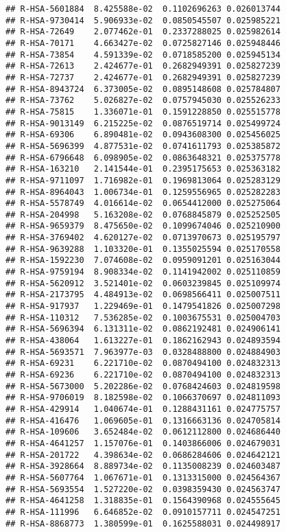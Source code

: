 \documentclass[
]{article}
\begin{document}
\begin{verbatim}
## R-HSA-5601884  8.425588e-02  0.1102696263 0.026013744
## R-HSA-9730414  5.906933e-02  0.0850545507 0.025985221
## R-HSA-72649    2.077462e-01  0.2337288025 0.025982614
## R-HSA-70171    4.663427e-02  0.0725827146 0.025948446
## R-HSA-73854    4.591339e-02  0.0718585200 0.025945134
## R-HSA-72613    2.424677e-01  0.2682949391 0.025827239
## R-HSA-72737    2.424677e-01  0.2682949391 0.025827239
## R-HSA-8943724  6.373005e-02  0.0895148608 0.025784807
## R-HSA-73762    5.026827e-02  0.0757945030 0.025526233
## R-HSA-75815    1.336071e-01  0.1591228850 0.025515778
## R-HSA-9013149  6.215225e-02  0.0876519714 0.025499724
## R-HSA-69306    6.890481e-02  0.0943608300 0.025456025
## R-HSA-5696399  4.877531e-02  0.0741611793 0.025385872
## R-HSA-6796648  6.098905e-02  0.0863648321 0.025375778
## R-HSA-163210   2.141544e-01  0.2395175653 0.025363182
## R-HSA-9711097  1.716982e-01  0.1969813064 0.025283129
## R-HSA-8964043  1.006734e-01  0.1259556965 0.025282283
## R-HSA-5578749  4.016614e-02  0.0654412000 0.025275064
## R-HSA-204998   5.163208e-02  0.0768845879 0.025252505
## R-HSA-9659379  8.475650e-02  0.1099674046 0.025210900
## R-HSA-3769402  4.620127e-02  0.0713970673 0.025195797
## R-HSA-9639288  1.103320e-01  0.1355025594 0.025170558
## R-HSA-1592230  7.074608e-02  0.0959091201 0.025163044
## R-HSA-9759194  8.908334e-02  0.1141942002 0.025110859
## R-HSA-5620912  3.521401e-02  0.0603239845 0.025109974
## R-HSA-2173795  4.484913e-02  0.0698566411 0.025007511
## R-HSA-917937   1.229469e-01  0.1479541826 0.025007298
## R-HSA-110312   7.536285e-02  0.1003675531 0.025004703
## R-HSA-5696394  6.131311e-02  0.0862192481 0.024906141
## R-HSA-438064   1.613227e-01  0.1862162943 0.024893594
## R-HSA-5693571  7.963977e-03  0.0328488800 0.024884903
## R-HSA-69231    6.221710e-02  0.0870494100 0.024832313
## R-HSA-69236    6.221710e-02  0.0870494100 0.024832313
## R-HSA-5673000  5.202286e-02  0.0768424603 0.024819598
## R-HSA-9706019  8.182598e-02  0.1066370697 0.024811093
## R-HSA-429914   1.040674e-01  0.1288431161 0.024775757
## R-HSA-416476   1.069605e-01  0.1316663136 0.024705814
## R-HSA-109606   3.652484e-02  0.0612112800 0.024686440
## R-HSA-4641257  1.157076e-01  0.1403866006 0.024679031
## R-HSA-201722   4.398634e-02  0.0686284606 0.024642121
## R-HSA-3928664  8.889734e-02  0.1135008239 0.024603487
## R-HSA-5607764  1.067671e-01  0.1313315000 0.024564367
## R-HSA-5693554  1.527220e-02  0.0398359430 0.024563747
## R-HSA-4641258  1.318835e-01  0.1564390968 0.024555645
## R-HSA-111996   6.646852e-02  0.0910157711 0.024547251
## R-HSA-8868773  1.380599e-01  0.1625588031 0.024498917

\end{verbatim}
\end{document}
